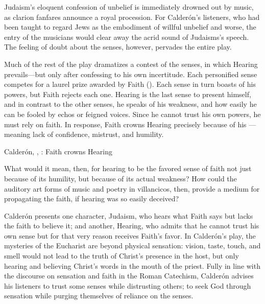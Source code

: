 Judaism's eloquent confession of unbelief is immediately drowned out by music, as clarion fanfares announce a royal procession.
For Calderón's listeners, who had been taught to regard Jews as the embodiment of willful unbelief and worse, the entry of the musicians would clear away the acrid sound of Judaisms's speech.
The feeling of doubt about the senses, however, pervades the entire play.

Much of the rest of the play dramatizes a contest of the senses, in which Hearing prevails---but only after confessing to his own incertitude.
Each personified sense competes for a laurel prize awarded by Faith ().
Each sense in turn boasts of his powers, but Faith rejects each one.
Hearing is the last sense to present himself, and in contrast to the other senses, he speaks of his weakness, and how easily he can be fooled by echos or feigned voices.
Since he cannot trust his own powers, he must rely on faith.
In response, Faith crowns Hearing precisely because of his ---meaning lack of confidence, mistrust, and humility.

\begin{expoem}
    \caption{Calderón, , : Faith crowns Hearing}
    \label{expoem:Calderon-Retiro-Hearing}
\end{expoem}

What would it mean, then, for hearing to be the favored sense of faith not just because of its humility, but because of its actual weakness?
How could the auditory art forms of music and poetry in villancicos, then, provide a medium for propagating the faith, if hearing was so easily deceived?

Calderón presents one character, Judaism, who hears what Faith says but lacks the faith to believe it; and another, Hearing, who admits that he cannot trust his own sense but for that very reason receives Faith's favor.
In Calderón's play, the mysteries of the Eucharist are beyond physical sensation: vision, taste, touch, and smell would not lead to the truth of Christ's presence in the host, but only hearing and believing Christ's words  in the mouth of the priest.
Fully in line with the discourse on sensation and faith in the Roman Catechism, Calderón advises his listeners to trust some senses while distrusting others; to seek God through sensation while purging themselves of reliance on the senses.

